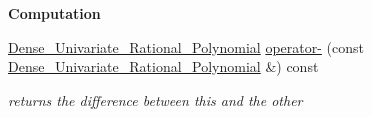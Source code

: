 \begin{Indent}\textbf{ Computation}\par
\begin{DoxyCompactItemize}
\item 
\mbox{\label{class_dense___univariate___rational___polynomial_a91d98d134a32b9089b6af40fc35c809f}} 
\hyperlink{class_dense___univariate___rational___polynomial}{Dense\+\_\+\+Univariate\+\_\+\+Rational\+\_\+\+Polynomial} \hyperlink{class_dense___univariate___rational___polynomial_a91d98d134a32b9089b6af40fc35c809f}{operator-\/} (const \hyperlink{class_dense___univariate___rational___polynomial}{Dense\+\_\+\+Univariate\+\_\+\+Rational\+\_\+\+Polynomial} \&) const
\begin{DoxyCompactList}\small\item\em returns the difference between {\ttfamily this} and the other \end{DoxyCompactList}\end{DoxyCompactItemize}
\end{Indent}
